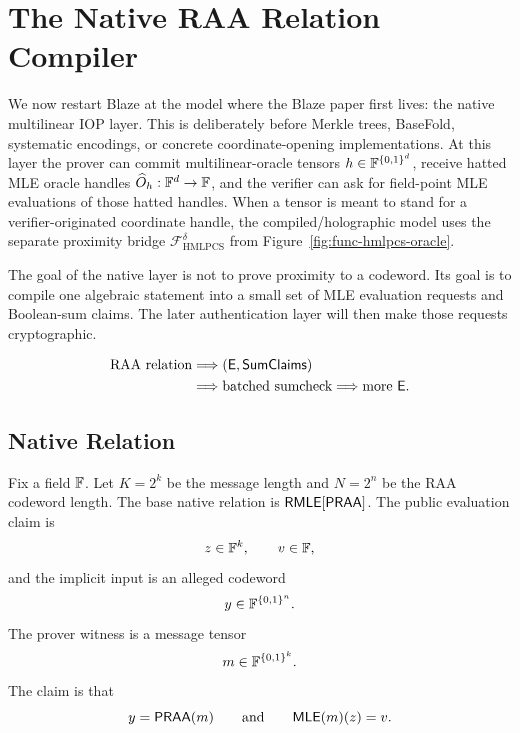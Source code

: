 \section{The Native RAA Relation Compiler}

We now restart Blaze at the model where the Blaze paper first lives: the native
multilinear IOP layer.  This is deliberately before Merkle trees, BaseFold,
systematic encodings, or concrete coordinate-opening implementations.  At this layer the prover
can commit multilinear-oracle tensors \(h\in\mathbb{F}^{\{0,1\}^d}\), receive hatted MLE
oracle handles \(\widehat O_h:\mathbb{F}^d\to\mathbb{F}\), and the verifier can ask for
field-point MLE evaluations of those hatted handles.  When a tensor is meant to
stand for a verifier-originated coordinate handle, the compiled/holographic
model uses the separate proximity bridge
\(\mathcal F_{\mathrm{HMLPCS}}^\delta\) from
Figure~\ref{fig:func-hmlpcs-oracle}.

The goal of the native layer is not to prove proximity to a codeword.  Its goal
is to compile one algebraic statement into a small set of MLE evaluation
requests and Boolean-sum claims.  The later authentication layer will then make
those requests cryptographic.

\[
  \begin{aligned}
  \text{RAA relation}
  &\Longrightarrow
  (\mathsf{E},\mathsf{SumClaims}) \\
  &\Longrightarrow
  \text{batched sumcheck}
  \Longrightarrow
  \text{more }\mathsf{E} .
  \end{aligned}
\]


\subsection{Native Relation}




Fix a field \(\mathbb{F}\).  Let \(K=2^k\) be the message length and \(N=2^n\) be the
RAA codeword length.  The base native relation is \(\mathsf{RMLE}[\mathsf{PRAA}]\).  The public
evaluation claim is
\[
  z\in\mathbb{F}^k,\qquad v\in\mathbb{F},
\]
and the implicit input is an alleged codeword 
\[
  y\in\mathbb{F}^{\{0,1\}^n}.
\]
The prover witness is a message tensor
\[
  m\in\mathbb{F}^{\{0,1\}^k}.
\]
The claim is that
\[
  y=\mathsf{PRAA}(m)
  \qquad\text{and}\qquad
  \mathsf{MLE}(m)(z)=v.
\]

